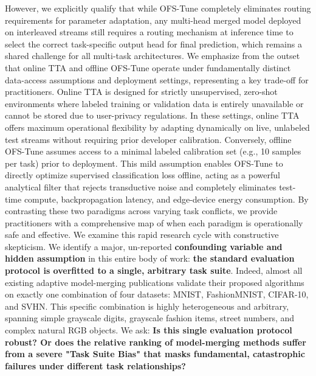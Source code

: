 However, we explicitly qualify that while OFS-Tune completely eliminates routing requirements for parameter adaptation, any multi-head merged model deployed on interleaved streams still requires a routing mechanism at inference time to select the correct task-specific output head for final prediction, which remains a shared challenge for all multi-task architectures.
We emphasize from the outset that online TTA and offline OFS-Tune operate under fundamentally distinct data-access assumptions and deployment settings, representing a key trade-off for practitioners.
Online TTA is designed for strictly unsupervised, zero-shot environments where labeled training or validation data is entirely unavailable or cannot be stored due to user-privacy regulations.
In these settings, online TTA offers maximum operational flexibility by adapting dynamically on live, unlabeled test streams without requiring prior developer calibration.
Conversely, offline OFS-Tune assumes access to a minimal labeled calibration set (e.g., 10 samples per task) prior to deployment.
This mild assumption enables OFS-Tune to directly optimize supervised classification loss offline, acting as a powerful analytical filter that rejects transductive noise and completely eliminates test-time compute, backpropagation latency, and edge-device energy consumption.
By contrasting these two paradigms across varying task conflicts, we provide practitioners with a comprehensive map of when each paradigm is operationally safe and effective.
We examine this rapid research cycle with constructive skepticism.
We identify a major, un-reported \textbf{confounding variable and hidden assumption} in this entire body of work: \textbf{the standard evaluation protocol is overfitted to a single, arbitrary task suite}.
Indeed, almost all existing adaptive model-merging publications validate their proposed algorithms on exactly one combination of four datasets: MNIST, FashionMNIST, CIFAR-10, and SVHN.
This specific combination is highly heterogeneous and arbitrary, spanning simple grayscale digits, grayscale fashion items, street numbers, and complex natural RGB objects.
We ask: \textbf{Is this single evaluation protocol robust?
Or does the relative ranking of model-merging methods suffer from a severe "Task Suite Bias" that masks fundamental, catastrophic failures under different task relationships?}

